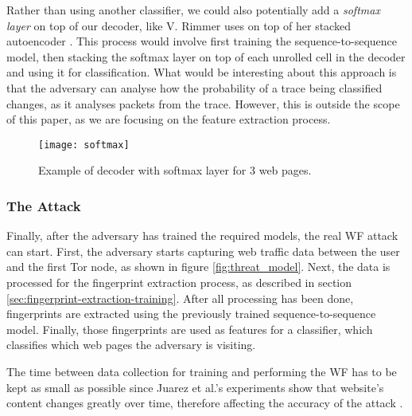 Rather than using another classifier, we could also potentially add a \textit{softmax layer} on top of our decoder, like V. Rimmer uses on top of her stacked autoencoder \cite{deeplearningthesis}.
This process would involve first training the sequence-to-sequence model, then stacking the softmax layer on top of each unrolled cell in the decoder and using it for classification.
What would be interesting about this approach is that the adversary can analyse how the probability of a trace being classified changes, as it analyses packets from the trace.
However, this is outside the scope of this paper, as we are focusing on the feature extraction process.

\begin{figure}[ht]
  \centering
  \texttt{[image: softmax]}
  \caption{Example of decoder with softmax layer for 3 web pages.}
  \label{fig:softmax}
\end{figure}

\subsubsection{The Attack}

Finally, after the adversary has trained the required models, the real WF attack can start.
First, the adversary starts capturing web traffic data between the user and the first Tor node, as shown in figure \ref{fig:threat_model}.
Next, the data is processed for the fingerprint extraction process, as described in section \ref{sec:fingerprint-extraction-training}.
After all processing has been done, fingerprints are extracted using the previously trained sequence-to-sequence model.
Finally, those fingerprints are used as features for a classifier, which classifies which web pages the adversary is visiting.

The time between data collection for training and performing the WF has to be kept as small as possible since Juarez et al.'s experiments show that website's content changes greatly over time, therefore affecting the accuracy of the attack \cite{wfpevaluation}.


